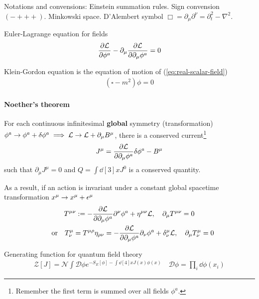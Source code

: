 \documentclass[main]{subfiles}
\begin{document}

\begin{multicols}{2}
Notations and convensions:
Einstein summation rules. Sign convension $(-+++)$. Minkowski space. D'Alembert symbol $\Box = \partial_\mu\partial^\nu = \partial_t^2 - \nabla^2$.

Euler-Lagrange equation for fields
\begin{gather}
    \pdv{\mathcal{L}}{\phi^a} - \partial_\mu\pdv{\mathcal{L}}{\partial_\mu \phi^a} = 0
\end{gather}

Klein-Gordon equation is the equation of motion of (\ref{eq:real-scalar-field})
\begin{gather}
    (\square - m^2)\phi = 0
\end{gather}

\paragraph{Noether's theorem} For each continuous infinitesimal \textbf{global} symmetry (transformation) $\phi^a \rightarrow \phi^a + \delta \phi^a \implies \mathcal{L} \rightarrow \mathcal{L} + \partial_{\mu}B^\mu$, there is a conserved current\footnote{Remember the first term is summed over all fields $\phi^a$.}
\begin{gather}
    J^\mu = \pdv{\mathcal{L}}{\partial_\mu\phi^a}\delta\phi^a - B^\mu
\end{gather}
such that $\partial_\mu J^\mu = 0$ and $Q = \int \dd[3]{x} J^0$ is a conserved quantity.

As a result, if an action is invariant under a constant global spacetime transformation $x^\mu \rightarrow x^\mu + \epsilon^\mu$
\begin{gather}
    T^{\mu\nu} := - \pdv{\La}{\partial_\mu\phi^a} \partial^\nu \phi^a + \eta^{\mu\nu}\mathcal{L} ,\quad \partial_{\mu } T^{\mu\nu} = 0\\
    \qq{or} T^\mu_\nu = T^{\mu\rho}\eta_{\rho\nu} = - \pdv{\La}{\partial_\mu\phi^a} \partial_\nu \phi^a + \delta^\mu_\nu\mathcal{L} ,\quad \partial_\mu T^\mu_\nu = 0
\end{gather}

Generating function for quantum field theory
\begin{gather}
\mathcal{Z}[J] = \mathcal{N} \int\mathcal{D}\phi e^{-S_E[\phi] - \int\dd[4]{x}J(x)\phi(x)} \quad \mathcal{D} \phi = \prod_i \dd{\phi(x_{i})}
\end{gather}

\end{multicols}
\end{document}
